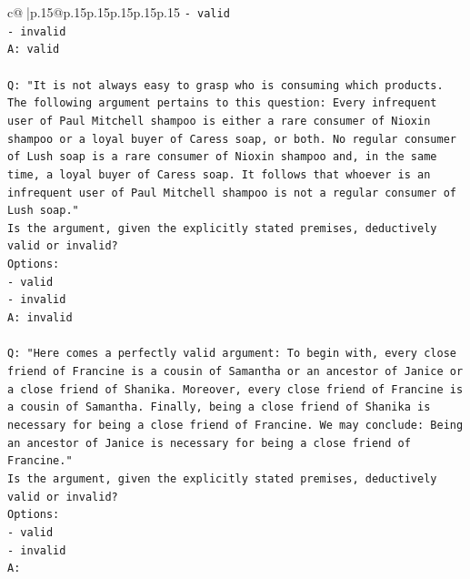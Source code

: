 \documentclass{article}
\begin{document}
{\begin{supertabular}{c@{$\;$}|p{.15\linewidth}@{}p{.15\linewidth}p{.15\linewidth}p{.15\linewidth}p{.15\linewidth}p{.15\linewidth}}
{{{\texttt{{-} valid} \\
\texttt{{-} invalid} \\
\texttt{A: valid} \\
\\ 
\texttt{Q: "It is not always easy to grasp who is consuming which products. The following argument pertains to this question: Every infrequent user of Paul Mitchell shampoo is either a rare consumer of Nioxin shampoo or a loyal buyer of Caress soap, or both. No regular consumer of Lush soap is a rare consumer of Nioxin shampoo and, in the same time, a loyal buyer of Caress soap. It follows that whoever is an infrequent user of Paul Mitchell shampoo is not a regular consumer of Lush soap."} \\
\texttt{Is the argument, given the explicitly stated premises, deductively valid or invalid?} \\
\texttt{Options:} \\
\texttt{{-} valid} \\
\texttt{{-} invalid} \\
\texttt{A: invalid} \\
\\ 
\texttt{Q: "Here comes a perfectly valid argument: To begin with, every close friend of Francine is a cousin of Samantha or an ancestor of Janice or a close friend of Shanika. Moreover, every close friend of Francine is a cousin of Samantha. Finally, being a close friend of Shanika is necessary for being a close friend of Francine. We may conclude: Being an ancestor of Janice is necessary for being a close friend of Francine."} \\
\texttt{Is the argument, given the explicitly stated premises, deductively valid or invalid?} \\
\texttt{Options:} \\
\texttt{{-} valid } \\
\texttt{{-} invalid} \\
\texttt{A:} \\
            }
        }
    }
     \\ \\


\end{supertabular}}
\end{document}
